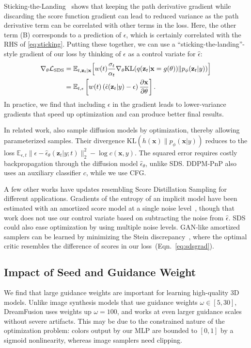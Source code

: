 \documentclass{article} %
\newcommand{\sname}{Score Distillation Sampling\xspace}
\newcommand{\sacc}{SDS\xspace}
\newcommand{\dreamfusion}{DreamFusion\xspace}
\newcommand{\x}[0]{\mathbf{x}}
\newcommand{\z}[0]{\mathbf{z}}
\newcommand{\zt}[0]{{\z}_t}
\newcommand{\ldist}[0]{\mathcal{L}_{\text{SDS}}}
\newcommand{\epshat}[2]{\hat{\epsilon}_\theta(#1; #2)}
\begin{document}
Sticking-the-Landing~\citep{stickingthelanding} shows that keeping the path derivative gradient while discarding the score function gradient can lead to reduced variance as the path derivative term can be correlated with other terms in the loss. Here, the other term (B) corresponds to a prediction of $\epsilon$, which is certainly correlated with the RHS of \eqref{eq:sticking}. Putting these together, we can use a ``sticking-the-landing''-style gradient of our loss by thinking of $\epsilon$ as a control variate for $\hat\epsilon$:
\begin{align}
\nabla_{\theta}\ldist &= \mathbb{E}_{t,\zt|\x} \Big[ w(t)\frac{\sigma_t}{\alpha_t} \nabla_\theta \text{KL}(q(\zt|\x=g(\theta)) \|  p_\phi(\zt | y)) \Big]\\
&= \mathbb{E}_{t,\epsilon}\left[w(t)\left(\hat\epsilon(\zt | y) - \epsilon\right) {\partial \x \over \partial \theta}\right]. \label{eq:SDS_grad}
\end{align}
In practice, we find that including $\epsilon$ in the gradient leads to lower-variance gradients that speed up optimization and can produce better final results.








In related work, \citet{ddpmpnp} also sample diffusion models by optimization, thereby allowing parameterized samples. Their divergence $\text{KL}(h(\x) \parallel p_\phi(\x | y))$ reduces to the loss $\mathbb{E}_{\epsilon, t} \| \epsilon - \epshat{\zt | y}{t}\|^2_2 - \log c(\x, y)$. The squared error requires costly backpropagation through the diffusion model $\hat{\epsilon}_\theta$, unlike \sacc. DDPM-PnP also uses an auxiliary classifier $c$, while we use CFG.

A few other works have updates resembling \sname for different applications. Gradients of the entropy of an implicit model have been estimated with an amortized score model at a single noise level~\citep{DBLP:journals/corr/abs-2006-05164}, though that work does not use our control variate based on subtracting the noise from $\hat{\epsilon}$. SDS could also ease optimization by using multiple noise levels. GAN-like amortized samplers can be learned by minimizing the Stein discrepancy~\citep{steinns, pmlr-v119-grathwohl20a}, where the optimal critic resembles the difference of scores in our loss~(Eqn.~\ref{eq:sdsgrad}).


\subsection{Impact of Seed and Guidance Weight}
We find that large guidance weights are important for learning high-quality 3D models. Unlike image synthesis models that use guidance weights $\omega \in [5, 30]$, \dreamfusion uses weights up $\omega=100$, and works at even larger guidance scales without severe artifacts. This may be due to the constrained nature of the optimization problem: colors output by our MLP are bounded to $[0, 1]$ by a sigmoid nonlinearity, whereas image samplers need clipping.
\end{document}
